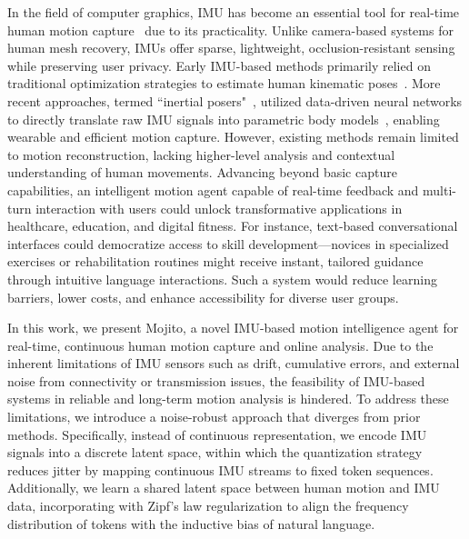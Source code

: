 In the field of computer graphics, IMU has become an essential tool for real-time human motion capture~\cite{noitom,Movella,mocopi} due to its practicality. Unlike camera-based systems for human mesh recovery, IMUs offer sparse, lightweight, occlusion-resistant sensing while preserving user privacy. Early IMU-based methods primarily relied on traditional optimization strategies to estimate human kinematic poses~\cite{von2017SIP}. More recent approaches, termed ``inertial posers"~\cite{huang2018DIP,TransPoseSIGGRAPH2021,PIPCVPR2022,van2024diffusionposer,yi2024pnp}, utilized data-driven neural networks to directly translate raw IMU signals into parametric body models~\cite{SMPL2015}, enabling wearable and efficient motion capture. However, existing methods remain limited to motion reconstruction, lacking higher-level analysis and contextual understanding of human movements. Advancing beyond basic capture capabilities, an intelligent motion agent capable of real-time feedback and multi-turn interaction with users could unlock transformative applications in healthcare, education, and digital fitness. For instance, text-based conversational interfaces could democratize access to skill development—novices in specialized exercises or rehabilitation routines might receive instant, tailored guidance through intuitive language interactions. Such a system would reduce learning barriers, lower costs, and enhance accessibility for diverse user groups.

In this work, we present Mojito, a novel IMU-based motion intelligence agent for real-time, continuous human motion capture and online analysis. Due to the inherent limitations of IMU sensors such as drift, cumulative errors, and external noise from connectivity or transmission issues, the feasibility of IMU-based systems in reliable and long-term motion analysis is hindered. To address these limitations, we introduce a noise-robust approach that diverges from prior methods. Specifically, instead of continuous representation, we encode IMU signals into a discrete latent space, within which the quantization strategy reduces jitter by mapping continuous IMU streams to fixed token sequences. Additionally, we learn a shared latent space between human motion and IMU data, incorporating with Zipf’s law regularization to align the frequency distribution of tokens with the inductive bias of natural language.

